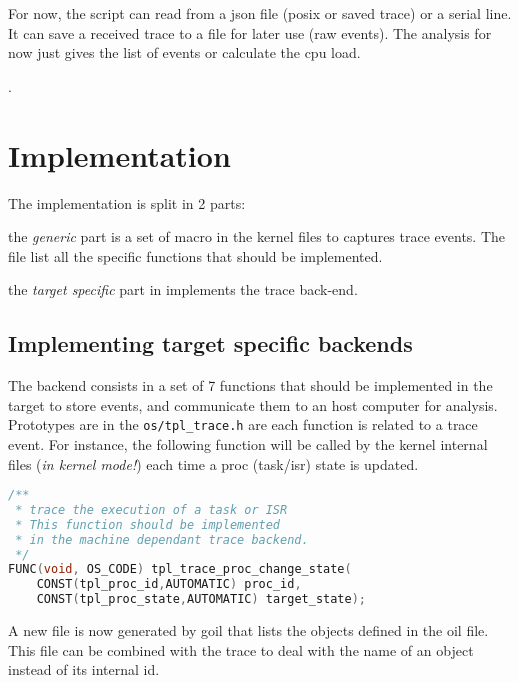 For now, the script can read from a json file (posix or saved trace) or a serial line. It can save a received trace to a file for later use (raw events). The analysis for now just gives the list of events or calculate the cpu load.

.

\section{Implementation}
The implementation is split in 2 parts:
\begin{pitemize}
	\item the \emph{generic} part is a set of macro in the  kernel files to captures trace events. The file  list all the specific functions that should be implemented.
	\item the \emph{target specific} part in  implements the trace back-end. 
\end{pitemize}

\subsection{Implementing target specific backends}
\label{sec:trace:targetbackend}

The backend consists in a set of 7 functions that should be implemented in the target to store events, and communicate them to an host computer for analysis. Prototypes are in the \texttt{os/tpl_trace.h} are each function is related to a trace event. For instance, the following function will be called by the kernel internal files (\emph{in kernel mode!}) each time a proc (task/isr) state is updated.

\begin{lstlisting}[language=C]
/**
 * trace the execution of a task or ISR
 * This function should be implemented
 * in the machine dependant trace backend.
 */
FUNC(void, OS_CODE) tpl_trace_proc_change_state(
    CONST(tpl_proc_id,AUTOMATIC) proc_id,
    CONST(tpl_proc_state,AUTOMATIC) target_state);
\end{lstlisting}

A new file is now generated by goil  that lists the objects defined in the oil file. This file can be combined with the trace to deal with the name of an object instead of its internal id.


